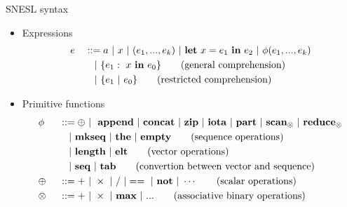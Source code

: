 \documentclass{beamer}
\begin{document}
\begin{frame}{SNESL syntax} 
	\begin{itemize}
		\item Expressions
		\begin{alignat*}{2}
		& e &&::=  a \ | \ x \ | \ (e_1,...,e_k) \ | \ \Let{x}{e_1}{e_2} \ | \ \hcall{\Tupk{e}} \\ 
		&   && \quad | \ \{e_1: \ x \ \*{in} \ e_0 \} \tag{general comprehension} \\
		&   && \quad | \ \{e_1 \ | \ e_0 \}\tag {restricted comprehension} 
		\end{alignat*}
		
  \item Primitive functions
		\begin{alignat*}{2} 
		&\hcall && ::= \oplus \ | \ \ \*{append} \ | \ \*{concat} \ | \ \*{zip} \ | \ \*{iota}  \ | \ \*{part}  \ | \ \*{scan}_{\otimes} \ | \ \*{reduce}_{\otimes}   \\
		&   && \quad | \ \*{mkseq} \ |  \ \*{the}  \ | \ \*{empty} \tag{sequence operations}\\
		&   && \quad | \ \*{length} \ | \ \*{elt}  \tag{vector operations}\\
		&   && \quad | \ \*{seq} \ | \ \*{tab} \tag{convertion between vector and sequence}\\
		& \oplus  \ && :: = +  \ | \ \times \ |  \  / \ | ==  \ | \ \*{not} \ | \ \cdots  \tag{scalar operations}\\
		& \otimes \ && :: = + \ | \ \times  \ | \ \*{max} \ | \ ...  \tag{associative binary operations}
		\end{alignat*}
	\end{itemize}
\end{frame}
\end{document}
